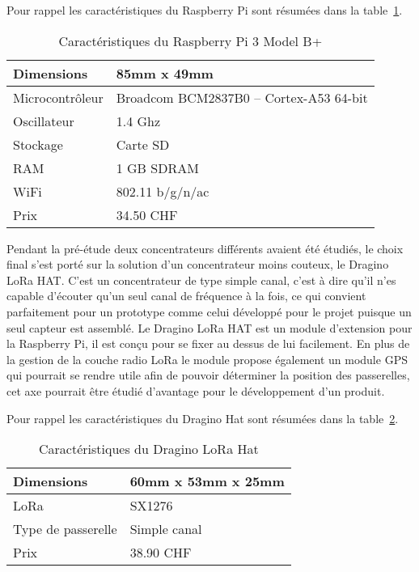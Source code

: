 Pour rappel les caractéristiques du Raspberry Pi sont résumées dans la table~\ref{tab:raspberry_cara}.

\begin{table}[htb]
\caption{Caractéristiques du Raspberry Pi 3 Model B+}
\label{tab:raspberry_cara}
\centering
\begin{tabular}{ l | l }
\toprule
Dimensions & 85mm x 49mm \\
\midrule
Microcontrôleur & Broadcom BCM2837B0 – Cortex-A53 64-bit \\
\midrule
Oscillateur & 1.4 Ghz \\
\midrule
Stockage & Carte SD \\
\midrule
RAM & 1 GB SDRAM \\
\midrule
WiFi & 802.11 b/g/n/ac \\
\midrule
Prix & 34.50 CHF\\
\bottomrule 
\end{tabular}
\end{table}

Pendant la pré-étude deux concentrateurs différents avaient été étudiés, le choix final s'est porté sur la solution d'un concentrateur moins couteux, le Dragino LoRa HAT. C'est un concentrateur de type simple canal, c'est à dire qu'il n'es capable d'écouter qu'un seul canal de fréquence à la fois, ce qui convient parfaitement pour un prototype comme celui développé pour le projet puisque un seul capteur est assemblé. Le Dragino LoRa HAT est un module d'extension pour la Raspberry Pi, il est conçu pour se fixer au dessus de lui facilement. En plus de la gestion de la couche radio LoRa le module propose également un module GPS qui pourrait se rendre utile afin de pouvoir déterminer la position des passerelles, cet axe pourrait être étudié d'avantage pour le développement d'un produit.

Pour rappel les caractéristiques du Dragino Hat sont résumées dans la table~\ref{tab:dragino_cara}.

\begin{table}[htb]
\caption{Caractéristiques du Dragino LoRa Hat}
\label{tab:dragino_cara}
\centering
\begin{tabular}{ l | l }
\toprule
Dimensions & 60mm x 53mm x 25mm \\
\midrule
LoRa & SX1276 \\
\midrule
Type de passerelle & Simple canal \\
\midrule
Prix & 38.90 CHF \\
\bottomrule
\end{tabular}
\end{table}

